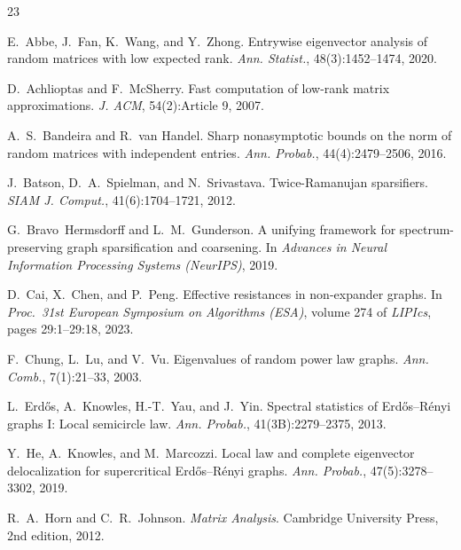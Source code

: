 \documentclass[11pt]{article}
\theoremstyle{definition}
\begin{document}
\begin{thebibliography}{23}

E.~Abbe, J.~Fan, K.~Wang, and Y.~Zhong.
\newblock Entrywise eigenvector analysis of random matrices with low expected rank.
\newblock \emph{Ann. Statist.}, 48(3):1452--1474, 2020.

D.~Achlioptas and F.~McSherry.
\newblock Fast computation of low-rank matrix approximations.
\newblock \emph{J. ACM}, 54(2):Article 9, 2007.

A.~S.~Bandeira and R.~van Handel.
\newblock Sharp nonasymptotic bounds on the norm of random matrices with independent entries.
\newblock \emph{Ann. Probab.}, 44(4):2479--2506, 2016.

J.~Batson, D.~A.~Spielman, and N.~Srivastava.
\newblock Twice-{R}amanujan sparsifiers.
\newblock \emph{SIAM J. Comput.}, 41(6):1704--1721, 2012.

G.~Bravo~Hermsdorff and L.~M.~Gunderson.
\newblock A unifying framework for spectrum-preserving graph sparsification and
coarsening.
\newblock In \emph{Advances in Neural Information Processing Systems (NeurIPS)}, 2019.

D.~Cai, X.~Chen, and P.~Peng.
\newblock Effective resistances in non-expander graphs.
\newblock In \emph{Proc.\ 31st European Symposium on Algorithms (ESA)},
volume 274 of \emph{LIPIcs}, pages 29:1--29:18, 2023.


F.~Chung, L.~Lu, and V.~Vu.
\newblock Eigenvalues of random power law graphs.
\newblock \emph{Ann. Comb.}, 7(1):21--33, 2003.

L.~Erd\H{o}s, A.~Knowles, H.-T.~Yau, and J.~Yin.
\newblock Spectral statistics of {E}rd\H{o}s--{R}\'{e}nyi graphs {I}: {L}ocal semicircle
law.
\newblock \emph{Ann. Probab.}, 41(3B):2279--2375, 2013.

Y.~He, A.~Knowles, and M.~Marcozzi.
\newblock Local law and complete eigenvector delocalization for supercritical
{E}rd\H{o}s--{R}\'{e}nyi graphs.
\newblock \emph{Ann. Probab.}, 47(5):3278--3302, 2019.

R.~A.~Horn and C.~R.~Johnson.
\newblock \emph{Matrix Analysis}.
\newblock Cambridge University Press, 2nd edition, 2012.


\end{thebibliography}
\end{document}
